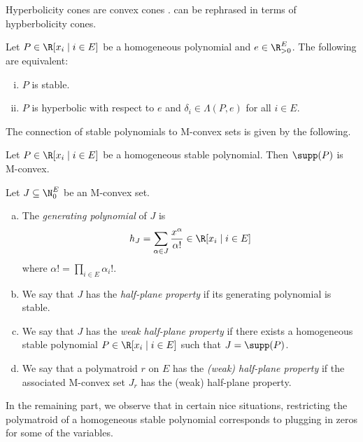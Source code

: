 Hyperbolicity cones are convex cones \cite{gar}.  can be rephrased in terms of hypberbolicity cones.

\begin{prop}
   Let $P\in\R[x_i\mid i\in E]$ be a homogeneous polynomial and $e\in\R_{>0}^E$. The following are equivalent:
   \begin{enumerate}[(i)]
        \item $P$ is stable.
       \item $P$ is hyperbolic with respect to $e$ and $\delta_i\in\Lambda(P,e)$ for all $i\in E$.
   \end{enumerate}
\end{prop}

The connection of stable polynomials to M-convex sets is given by the following.

\begin{thm}
    Let $P\in\R[x_i\mid i\in E]$ be a homogeneous stable polynomial. Then $\supp(P)$ is M-convex.
\end{thm}

\begin{Def}
    Let $J\subseteq\N_0^E$ be an M-convex set.
    \begin{enumerate}[(a)]
        \item The \emph{generating polynomial} of $J$ is
        \begin{equation*}
            h_J=\sum_{\alpha\in J}\frac{x^\alpha}{\alpha!}\in \R[x_i\mid i\in E]
        \end{equation*}
        where $\alpha!=\prod_{i\in E}\alpha_i!$.
        \item We say that $J$ has the \emph{half-plane property} if its generating polynomial is stable.
        \item We say that $J$ has the \emph{weak half-plane property} if there exists a homogeneous stable polynomial $P\in\R[x_i\mid i\in E]$ such that $J=\supp(P)$.
        \item We say that a polymatroid $r$ on $E$ has the \emph{(weak) half-plane property} if the associated M-convex set $J_r$ has the (weak) half-plane property.
    \end{enumerate}
\end{Def}

In the remaining part, we observe that in certain nice situations, restricting the polymatroid of a homogeneous stable polynomial corresponds to plugging in zeros for some of the variables.

